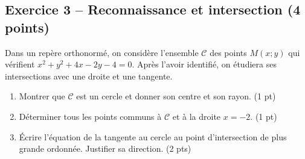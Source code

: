 \subsection*{Exercice 3 -- Reconnaissance et intersection (4 points)}
Dans un repère orthonormé, on considère l’ensemble $\mathcal C$ des points $M(x;y)$ qui vérifient $x^2+y^2+4x-2y-4=0$. Après l’avoir identifié, on étudiera ses intersections avec une droite et une tangente.
\begin{enumerate}
\item Montrer que $\mathcal C$ est un cercle et donner son centre et son rayon. \hfill(1 pt)
\item Déterminer tous les points communs à $\mathcal C$ et à la droite $x=-2$. \hfill(1 pt)
\item Écrire l’équation de la tangente au cercle au point d’intersection de plus grande ordonnée. Justifier sa direction. \hfill(2 pts)
\end{enumerate}
